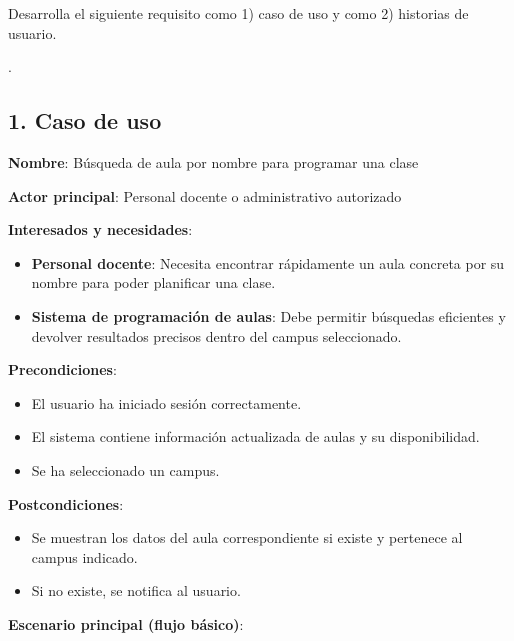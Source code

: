 

\begin{enunciado}
    Desarrolla el siguiente requisito como 1) caso de uso y como 2) historias de usuario.

    .
\end{enunciado}

\subsection{1. Caso de uso}\label{subsec:1.-caso-de-uso}
\begin{solucion}[title=Caso de uso]
    \textbf{Nombre}: Búsqueda de aula por nombre para programar una clase

    \textbf{Actor principal}: Personal docente o administrativo autorizado

    \textbf{Interesados y necesidades}:

    \begin{itemize}
        \item \textbf{Personal docente}: Necesita encontrar rápidamente un aula concreta por su nombre para poder planificar una clase.
        \item \textbf{Sistema de programación de aulas}: Debe permitir búsquedas eficientes y devolver resultados precisos dentro del campus seleccionado.
    \end{itemize}
    \textbf{Precondiciones}:

    \begin{itemize}
        \item El usuario ha iniciado sesión correctamente.
        \item El sistema contiene información actualizada de aulas y su disponibilidad.
        \item Se ha seleccionado un campus.
    \end{itemize}
    \textbf{Postcondiciones}:

    \begin{itemize}
        \item Se muestran los datos del aula correspondiente si existe y pertenece al campus indicado.
        \item Si no existe, se notifica al usuario.
    \end{itemize}
    \textbf{Escenario principal (flujo básico)}:


\end{solucion}
